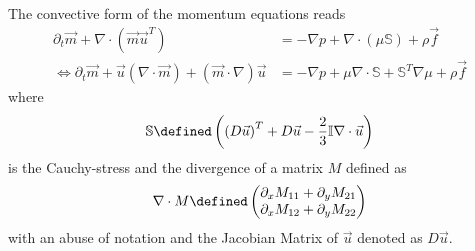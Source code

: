 
The convective form of the momentum equations reads
\begin{equation}
  \label{eq: compressible NS}
  \begin{aligned}
    \partial_t \vec{m} + \nabla \cdot (\vec{m}\vec{u}^T)
    &= - \nabla p + \nabla \cdot (\mu\mathbb{S}) + \rho \vec{f} \\
    \Leftrightarrow\partial_t \vec{m} + \vec{u}(\nabla \cdot \vec{m}) + (\vec{m} \cdot \nabla)\vec{u}
    &= - \nabla p + \mu \nabla \cdot \mathbb{S} + \mathbb{S}^T \nabla\mu + \rho \vec{f}
  \end{aligned}
\end{equation}
where
\begin{equation}
  \mathbb{S} \defined \left({(D\vec{u})}^T + D\vec{u} - \frac{2}{3}\mathbb{I}\nabla\cdot\vec{u} \right)
\end{equation}
is the Cauchy-stress and the divergence of a matrix $M$ defined as
\begin{equation}
  \nabla \cdot M \defined
  \begin{pmatrix}
    \partial_x M_{11} + \partial_y M_{21} \\
    \partial_x M_{12} + \partial_y M_{22}
  \end{pmatrix}
\end{equation}
with an abuse of notation and the Jacobian Matrix of $\vec{u}$ denoted as $D\vec{u}$.

